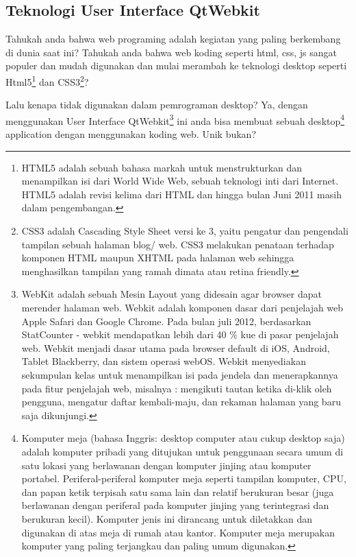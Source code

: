 \subsection{Teknologi User Interface
QtWebkit}\label{teknologi-user-interface-qtwebkit}

Tahukah anda bahwa web programing adalah kegiatan yang paling berkembang
di dunia saat ini? Tahukah anda bahwa web koding seperti html, css, js
sangat populer dan mudah digunakan dan mulai merambah ke teknologi
desktop seperti Html5\footnote{HTML5 adalah sebuah bahasa markah untuk menstrukturkan dan menampilkan isi dari World Wide Web, sebuah teknologi inti dari Internet. HTML5 adalah revisi kelima dari HTML dan hingga bulan Juni 2011 masih dalam pengembangan.} dan CSS3\footnote{CSS3 adalah Cascading Style Sheet versi ke 3, yaitu pengatur dan pengendali tampilan sebuah halaman blog/ web. CSS3 melakukan penataan terhadap komponen HTML maupun XHTML pada halaman web sehingga menghasilkan tampilan yang ramah dimata atau retina friendly.}?

Lalu kenapa tidak digunakan dalam pemrograman desktop? Ya, dengan
menggunakan User Interface QtWebkit\footnote{WebKit adalah sebuah Mesin Layout yang didesain agar browser dapat merender halaman web. Webkit adalah komponen dasar dari penjelajah web Apple Safari dan Google Chrome. Pada bulan juli 2012, berdasarkan StatCounter - webkit mendapatkan lebih dari 40 \% kue di pasar penjelajah web. Webkit menjadi dasar utama pada browser default di iOS, Android, Tablet Blackberry, dan sistem operasi webOS. Webkit menyediakan sekumpulan kelas untuk menampilkan isi pada jendela dan menerapkannya pada fitur penjelajah web, misalnya : mengikuti tautan ketika di-klik oleh pengguna, mengatur daftar kembali-maju, dan rekaman halaman yang baru saja dikunjungi.} ini anda bisa membuat sebuah desktop\footnote{Komputer meja (bahasa Inggris: desktop computer atau cukup desktop saja) adalah komputer pribadi yang ditujukan untuk penggunaan secara umum di satu lokasi yang berlawanan dengan komputer jinjing atau komputer portabel. Periferal-periferal komputer meja seperti tampilan komputer, CPU, dan papan ketik terpisah satu sama lain dan relatif berukuran besar (juga berlawanan dengan periferal pada komputer jinjing yang terintegrasi dan berukuran kecil). Komputer jenis ini dirancang untuk diletakkan dan digunakan di atas meja di rumah atau kantor. Komputer meja merupakan komputer yang paling terjangkau dan paling umum digunakan.}
application dengan menggunakan koding web. Unik bukan?

